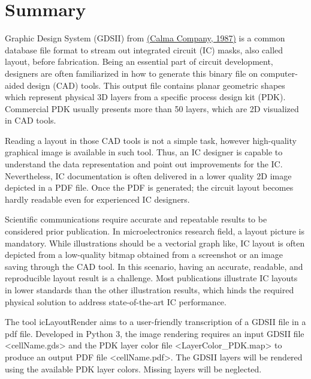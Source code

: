 \documentclass[10pt,a4paper,onecolumn]{article}
\begin{document}
\hypertarget{summary}{%
\section{Summary}\label{summary}}

Graphic Design System (GDSII) from \hyperlink{ref-Calma1987}{(Calma Company, 1987)} is a common
database file format to stream out integrated circuit (IC) masks, also
called layout, before fabrication. Being an essential part of circuit
development, designers are often familiarized in how to generate this
binary file on computer-aided design (CAD) tools. This output file
contains planar geometric shapes which represent physical 3D layers from
a specific process design kit (PDK). Commercial PDK usually presents
more than 50 layers, which are 2D visualized in CAD tools.

Reading a layout in those CAD tools is not a simple task, however
high-quality graphical image is available in such tool. Thus, an IC
designer is capable to understand the data representation and point out
improvements for the IC. Nevertheless, IC documentation is often
delivered in a lower quality 2D image depicted in a PDF file. Once the
PDF is generated; the circuit layout becomes hardly readable even for
experienced IC designers.

Scientific communications require accurate and repeatable results to be
considered prior publication. In microelectronics research field, a
layout picture is mandatory. While illustrations should be a vectorial
graph like, IC layout is often depicted from a low-quality bitmap
obtained from a screenshot or an image saving through the CAD tool. In
this scenario, having an accurate, readable, and reproducible layout
result is a challenge. Most publications illustrate IC layouts in lower
standards than the other illustration results, which hinds the required
physical solution to address state-of-the-art IC performance.

The tool icLayoutRender aims to a user-friendly transcription of a GDSII
file in a pdf file. Developed in Python 3, the image rendering requires
an input GDSII file \textless cellName.gds\textgreater{} and the PDK
layer color file \textless LayerColor\_PDK.map\textgreater{} to produce
an output PDF file \textless cellName.pdf\textgreater. The GDSII layers
will be rendered using the available PDK layer colors. Missing layers
will be neglected.
\end{document}
